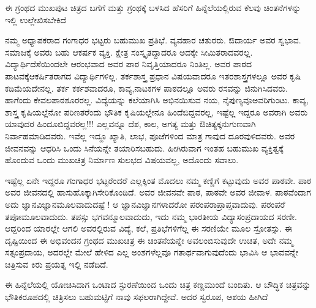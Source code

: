 {ಈ ಗ್ರಂಥದ ಮುಖಪುಟ ಚಿತ್ರದ ಬಗೆಗೆ ಮತ್ತು ಗ್ರಂಥಕ್ಕೆ ಬಳಸಿದ ಹೆಸರಿಗೆ ಹಿನ್ನೆಲೆಯಲ್ಲಿರುವ ಕೆಲವು ಚಿಂತನೆಗಳನ್ನು ಇಲ್ಲಿ ಉಲ್ಲೇಖಿಸಬೇಕಿದೆ 

ನಮ್ಮ ಅಧ್ಯಾಪಕರಾದ ಗಂಗಾಧರ ಭಟ್ಟರು ಬಹುಮುಖ ಪ್ರತಿಭೆ. ವ್ಯವಹಾರ ಚತುರರು. ಔದಾರ್ಯ ಅವರ ಸ್ವಭಾವ. ಸಮಾಜಕ್ಕೆ ಅವರು ಬಹು ಆಕರ್ಷಕ ವ್ಯಕ್ತಿ. ಕ್ಷೇತ್ರ ಸಂಸ್ಕೃತದ್ದಾದರೂ ಅದಕ್ಕೇ ಸೀಮಿತರಾದವರಲ್ಲ. ವಿದ್ಯಾರ್ಥಿದೆಸೆಯಿಂದಲೇ ಆರಂಭವಾದ ಅವರ ಪಾಠ ನಿವೃತ್ತಿಯಾದರೂ ನಿಂತಿಲ್ಲ. ಅವರ ಪಾಠದ ಪಾಟವಕ್ಕೆ\break ಆಕರ್ಷಿತರಾಗದ ವಿದ್ಯಾರ್ಥಿಗಳಿಲ್ಲ. ತರ್ಕಶಾಸ್ತ್ರ ಪ್ರಧಾನ ವಿಷಯವಾದರೂ ಇತರ\break ಶಾಸ್ತ್ರಗಳಲ್ಲೂ ಅವರ ಕೃಷಿ ಕಡಿಮೆಯದೇನಲ್ಲ. ತರ್ಕ ಕರ್ಕಶವಾದರೂ, ಕಾವ್ಯ,\break ನಾಟಕಗಳ ಪಾಠದಲ್ಲೂ ಅವರು ರಸವನ್ನು ಜಿನುಗಿಸಿದವರು. ಹಾಗೆಂದು ಕೇವಲ\break ಪಾಠಶೂರರಲ್ಲ. ವಿದ್ಯೆಯನ್ನು  ಕಲೆಯಾಗಿಸಿ ಅಭಿನಯಿಸುವ ನಯ, ನೈಪುಣ್ಯವೂ\break ಅವರಿಗುಂಟು. ಕಾವ್ಯ, ಶಾಸ್ತ್ರ ಕೃಷಿಯಲ್ಲೆನೋ ಪರಿಣತರೆಂದು ಭೌತಿಕ \hbox{ಕೃಷಿಯಲ್ಲೇನೂ} ಹಿಂದೆಬಿದ್ದವರಲ್ಲ, ಇಷ್ಟೆಲ್ಲ ಇದ್ದರೂ ಅವರಾಗಿ ಅವರು ಯಾವುದರ ಹಿಂದೂ\break ಬಿದ್ದವರಲ್ಲ!!! ಎಲ್ಲವನ್ನೂ ದೆಶ, ಕಾಲ, ಅಗತ್ಯ ಮತ್ತು ಔಚಿತ್ಯಕ್ಕನುಗುಣವಾಗಿ ನಿರ್ವಾಹ\-ಮಾಡಿದವರು. ಇವೆಲ್ಲ ಇದ್ದೂ ಖ್ಯಾತಿ, ಲಾಭ, ಪೂಜೆಗಳಿಂದ ಮಾತ್ರ ಗಾವುದ ದೂರವುಳಿ\-ದವರು. ಅವರ ಜೀವನವನ್ನು ಆಧರಿಸಿ ಒಂದು ಸಿನೆಯನ್ನೇ ತಯಾರಿಸ\-ಬಹುದು. ಹೀಗಿರುವಾಗ ಇಂತಹ ಬಹುಮುಖ ವ್ಯಕ್ತಿತ್ವಕ್ಕೆ ಹೊಂದುವ ಒಂದು ಮುಖಚಿತ್ರ ನಿರ್ಮಾಣ ಸುಲಭದ ವಿಷಯವಲ್ಲ, ಅದೊಂದು ಸವಾಲು.

ಇಷ್ಟೆಲ್ಲ ಏನೇ ಇದ್ದರೂ ಗಂಗಾಧರ ಭಟ್ಟರೆಂದರೆ ಎಲ್ಲಕ್ಕಿಂತ ಮೊದಲು ನಮ್ಮ ಕಣ್ಣಿಗೆ ಕಟ್ಟುವುದು ಅವರ ಪಾಠವೇ. ಪಾಠ ಅವರ ಜೀವನದಲ್ಲಿ ಹಾಸು\enginline{-}ಹೊಕ್ಕಾಗಿ\break ಸೇರಿಕೊಂಡಿದೆ.  ಅವರ ಜೀವನವೇ ಪಾಠ, ಪಾಠವೇ ಅವರ ಜೀವಾಳ. ಪಾಠವೆಂದಾಗ ಅದು ಜ್ಞಾನ\enginline{-}ವಿಜ್ಞಾನಮೂಲವಾದುದಷ್ಟೆ ! ಆ ಜ್ಞಾನ\enginline{-}ವಿಜ್ಞಾನಗಳಾದರೋ ಪರಂಪರಾಪ್ರಾಪ್ತವಾದುವು. ಪರಂಪರೆ ತಪೋಮೂಲವಾದುದು. ತಪಸ್ಸು ಭಗವನ್ಮೂಲವಾದುದು, ಇದು ನಮ್ಮ ಭಾರತೀಯ ವಿದ್ಯಾಸಂಪ್ರದಾಯದ ಸರಣೀ. ಆದ್ದರಿಂದ ಯಾರಲ್ಲೇ ಆಗಲಿ ಅವರಲ್ಲಿರುವ ವಿದ್ಯೆ, ಕಲೆ, ಪ್ರತಿಭೆಗಳಿಗೆಲ್ಲ ಈ ಸರಣಿಯೇ ಮೂಲ ಸ್ರೋತಸ್ಸು. ಈ ದೃಷ್ಟಿಯಿಂದ ಈ ಅಭಿವಂದನ ಗ್ರಂಥದ ಮುಖಚಿತ್ರ ಈ ಚಿಂತನೆಯನ್ನೇ ಅವಲಂಬಿಸುವುದೇ ಉಚಿತ, ಅದೇ ನಮ್ಮ ಸತ್ಸಂಪ್ರದಾಯ, ಅದರಲ್ಲೇ ಮೇಲೆ ಹೇಳಿದ ಎಲ್ಲ ಅಂಶಗಳೆಲ್ಲವೂ ಗತಾರ್ಥವಾಗುವುದೆಂದು ಭಾವಿಸಿ ಆ ಭಾವವನ್ನೇ ಚಿತ್ರಿಸುವ ಕಿರು ಪ್ರಯತ್ನ ಇಲ್ಲಿ ನಡೆದಿದೆ.

ಈ ಹಿನ್ನೆಲೆಯಲ್ಲಿ ಯೋಚಿಸಿದಾಗ ಒಂಟಾದ ಸ್ಫುರಣೆಯಿಂದ ಒಂದು ಚಿತ್ರ ಕಣ್ಣಮುಂದೆ ಬಂದಿತು. ಆ ಬೌದ್ಧಿಕ ಚಿತ್ರವನ್ನು ಭೌತಿಕರೂಪದಲ್ಲಿ ಚಿತ್ರಿಸಲು ಬಹುಮಟ್ಟಿಗೆ ನಾವು ಸಫಲರಾಗಿದ್ದೇವೆ. ಅದರ ಸ್ವರೂಪ, ಆಶಯ ಹೀಗಿದೆ  \enginline{-} 

}
